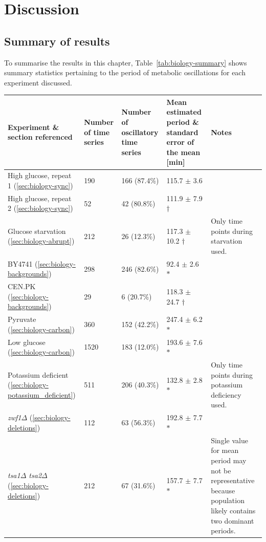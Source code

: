 \section{Discussion}
\label{sec:biology-discussion}

\subsection{Summary of results}
\label{subsec:biology-discussion-summary}

To summarise the results in this chapter, Table~\ref{tab:biology-summary} shows summary statistics pertaining to the period of metabolic oscillations for each experiment discussed.

\begin{table}[htb!]
  \footnotesize
  \centering
  \begin{tabularx}{\linewidth}{bbbbb}
    \toprule
    Experiment \& section referenced & Number of time series & Number of oscillatory time series & Mean estimated period \& standard error of the mean [min] & Notes\\
    \midrule
    High glucose, repeat 1 (\ref{sec:biology-sync}) & 190 & 166 (87.4\%) & 115.7 $\pm$ 3.6 & \\
    High glucose, repeat 2 (\ref{sec:biology-sync}) & 52 & 42 (80.8\%) & 111.9 $\pm$ 7.9 $\dagger$ & \\
    Glucose starvation (\ref{sec:biology-abrupt}) & 212 & 26 (12.3\%) & 117.3 $\pm$ 10.2 $\dagger$ & Only time points during starvation used.\\
    BY4741 (\ref{sec:biology-backgrounds}) & 298 & 246 (82.6\%) & 92.4 $\pm$ 2.6 $\ast$ & \\
    CEN.PK (\ref{sec:biology-backgrounds}) & 29 & 6 (20.7\%) & 118.3 $\pm$ 24.7 $\dagger$ & \\
    Pyruvate (\ref{sec:biology-carbon}) & 360 & 152 (42.2\%) & 247.4 $\pm$ 6.2 $\ast$ & \\
    Low glucose (\ref{sec:biology-carbon}) & 1520 & 183 (12.0\%) & 193.6 $\pm$ 7.6 $\ast$ & \\
    Potassium deficient (\ref{sec:biology-potassium_deficient}) & 511 & 206 (40.3\%) & 132.8 $\pm$ 2.8 $\ast$ & Only time points during potassium deficiency used.\\
    \textit{zwf1$\Delta$} (\ref{sec:biology-deletions}) & 112 & 63 (56.3\%) & 192.8 $\pm$ 7.7 $\ast$ & \\
    \textit{tsa1$\Delta$ tsa2$\Delta$} (\ref{sec:biology-deletions}) & 212 & 67 (31.6\%) & 157.7 $\pm$ 7.7 $\ast$ & Single value for mean period may not be representative because population likely contains two dominant periods.\\

\end{tabularx}
\end{table}
